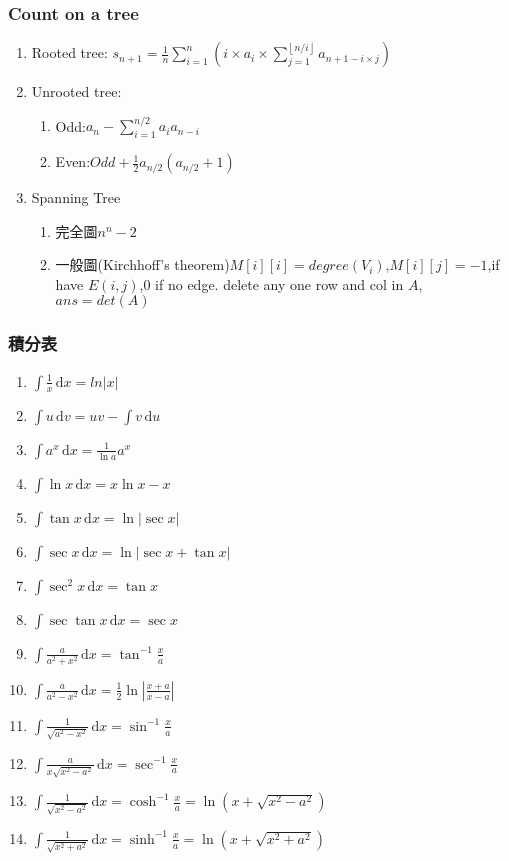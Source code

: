 \subsubsection{Count on a tree}
\begin{enumerate}\itemsep = -5pt
	\item Rooted tree: $s_{n+1}=\frac{1}{n}\sum_{i=1}^{n}(i\times a_i\times \sum_{j=1}^{\left \lfloor  n/i\right \rfloor} a_{n+1-i\times j})$
	\item Unrooted tree: 
	\begin{enumerate}\itemsep = -2pt
		\item Odd:$a_n-\sum_{i=1}^{n/2}a_ia_{n-i}$
		\item Even:$Odd+\frac{1}{2}a_{n/2}(a_{n/2}+1)$
	\end{enumerate}
	\item Spanning Tree
	\begin{enumerate}\itemsep = -2pt
		\item 完全圖$n^n-2$
		\item 一般圖(Kirchhoff's theorem)$M[i][i]=degree(V_i)$,$M[i][j]=-1$,if have $E(i,j)$,$0$ if no edge. delete any one row and col in $A$, $ans = det(A)$
	\end{enumerate}
\end{enumerate}

\subsubsection{積分表}
\begin{enumerate}\itemsep = -5pt
	\item $\int \frac{1}{x}\, \mathrm{d}x = ln|x|$
	\item $\int u\, \mathrm{d}v = uv-\int v\, \mathrm{d}u$
	\item $\int a^x\, \mathrm{d}x = \frac{1}{\ln a}a^x$
	\item $\int \ln x\, \mathrm{d}x = x\ln x-x$
	\item $\int \tan x\, \mathrm{d}x = \ln |\sec x|$
	\item $\int \sec x\, \mathrm{d}x = \ln |\sec x+\tan x|$
	\item $\int \sec^2 x\, \mathrm{d}x = \tan x$
	\item $\int \sec \tan x\, \mathrm{d}x = \sec x$
	\item $\int \frac{a}{a^2+x^2}\, \mathrm{d}x = \tan^{-1} \frac{x}{a}$
	\item $\int \frac{a}{a^2-x^2}\, \mathrm{d}x = \frac{1}{2}\ln |\frac{x+a}{x-a}|$
	\item $\int \frac{1}{\sqrt{a^2-x^2}}\, \mathrm{d}x = \sin^{-1} \frac{x}{a}$
	\item $\int \frac{a}{x\sqrt{x^2-a^2}}\, \mathrm{d}x = \sec^{-1} \frac{x}{a}$
	\item $\int \frac{1}{\sqrt{x^2-a^2}}\, \mathrm{d}x = \cosh^{-1} \frac{x}{a}=\ln (x+\sqrt{x^2-a^2})$
	\item $\int \frac{1}{\sqrt{x^2+a^2}}\, \mathrm{d}x = \sinh^{-1} \frac{x}{a}=\ln (x+\sqrt{x^2+a^2})$
\end{enumerate}

%